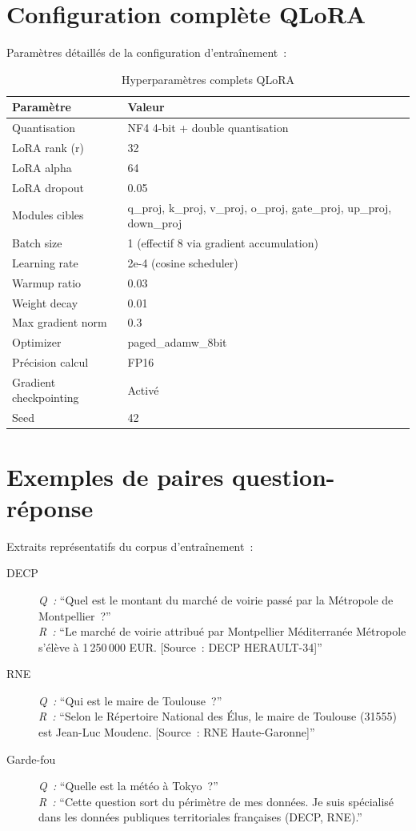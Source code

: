 \documentclass[12pt,a4paper,twoside]{report}
\begin{document}
\section{Configuration complète QLoRA}

Paramètres détaillés de la configuration d'entraînement~:

\begin{table}[h]
\centering
\small
\caption{Hyperparamètres complets QLoRA}
\begin{tabular}{@{}ll@{}}
\toprule
\textbf{Paramètre} & \textbf{Valeur} \\ \midrule
Quantisation & NF4 4-bit + double quantisation \\
LoRA rank (r) & 32 \\
LoRA alpha & 64 \\
LoRA dropout & 0.05 \\
Modules cibles & q\_proj, k\_proj, v\_proj, o\_proj, gate\_proj, up\_proj, down\_proj \\
Batch size & 1 (effectif 8 via gradient accumulation) \\
Learning rate & 2e-4 (cosine scheduler) \\
Warmup ratio & 0.03 \\
Weight decay & 0.01 \\
Max gradient norm & 0.3 \\
Optimizer & paged\_adamw\_8bit \\
Précision calcul & FP16 \\
Gradient checkpointing & Activé \\
Seed & 42 \\
\bottomrule
\end{tabular}
\end{table}

\section{Exemples de paires question-réponse}

Extraits représentatifs du corpus d'entraînement~:

\begin{description}
    \item[DECP] \textit{Q~:} ``Quel est le montant du marché de voirie passé par la Métropole de Montpellier~?'' \\
    \textit{R~:} ``Le marché de voirie attribué par Montpellier Méditerranée Métropole s'élève à 1\,250\,000 EUR. [Source~: DECP HERAULT-34]''
    
    \item[RNE] \textit{Q~:} ``Qui est le maire de Toulouse~?'' \\
    \textit{R~:} ``Selon le Répertoire National des Élus, le maire de Toulouse (31555) est Jean-Luc Moudenc. [Source~: RNE Haute-Garonne]''
    
    \item[Garde-fou] \textit{Q~:} ``Quelle est la météo à Tokyo~?'' \\
    \textit{R~:} ``Cette question sort du périmètre de mes données. Je suis spécialisé dans les données publiques territoriales françaises (DECP, RNE).''
\end{description}
\end{document}
